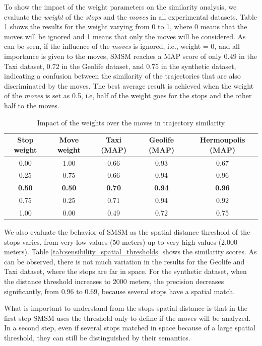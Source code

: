 {To show the impact of the weight parameters on the similarity analysis, we evaluate the \emph{weight} of the \emph{stops} and the \emph{moves} in all experimental datasets. Table {\ref{tab:sensibility_stopmove}} shows the results for the weight varying from 0 to 1, where 0 means that the moves will be ignored and 1 means that only the moves will be considered.  As can be seen, if the influence of the \emph{moves} is ignored, i.e., weight = 0, and all importance is given to the moves, SMSM reaches a MAP score of only $0.49$ in the Taxi dataset, $0.72$ in the Geolife dataset, and $0.75$ in the synthetic dataset, indicating a confusion between the similarity of the trajectories that are also discriminated by the moves. The best average result is achieved when the weight of the \emph{moves} is set as 0.5, i.e, half of the weight goes for the stops and the other half to the moves.}

\begin{table}[ht!]
  \scriptsize
  \centering
  \begin{tabular}{|c|c|c|c|c|}
  \hline
Stop weight & Move weight & Taxi (MAP) & Geolife (MAP) & Hermoupolis (MAP) \\
  \hline
0.00 & 1.00 & 0.66 & 0.93 & 0.67\\
0.25 & 0.75 & 0.66 & 0.94 & 0.96\\
\textbf{0.50} & \textbf{0.50} & \textbf{0.70} & \textbf{0.94} & \textbf{0.96}\\
0.75 & 0.25 & 0.71 & 0.94 & 0.92\\
1.00 & 0.00 & 0.49 & 0.72 & 0.75 \\
    \hline
  \end{tabular}
  \caption{Impact of the weights over the moves in trajectory similarity}
  \label{tab:sensibility_stopmove}
\end{table}

{We also evaluate the behavior of SMSM as the spatial distance threshold of the stops varies, from very low values (50 meters) up to very high values (2,000 meters). Table {\ref{tab:sensibility_spatial_thresholds}} shows the similarity scores. As can be observed, there is not much variation in the results for the Geolife and Taxi dataset, where the stops are far in space. For the synthetic dataset, when the distance threshold increases to 2000 meters, the precision decreases significantly, from 0.96 to 0.69, because several stops have a spatial match.}

{What is important to understand from the stops spatial distance is that in the first step SMSM uses the threshold only to define if the moves will be analyzed. In a second step, even if several stops matched in space because of a large spatial threshold, they can still be distinguished by their semantics.}




